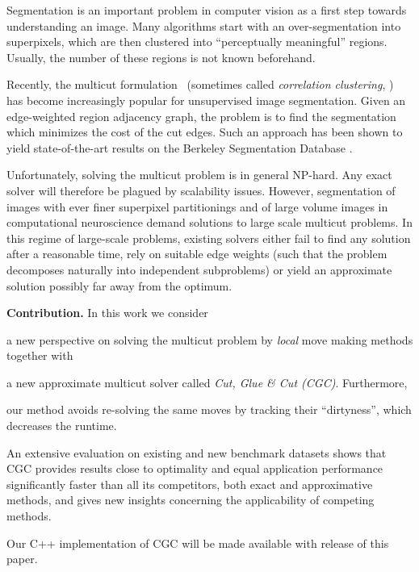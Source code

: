 Segmentation is an important problem in computer vision as a first step
towards understanding an image. Many algorithms start with an over-segmentation
into superpixels, which are then clustered into ``perceptually meaningful''
regions.
Usually, the number of these regions is not known beforehand.

Recently, the multicut formulation~\cite{chopra_1993_mp}
(sometimes called \emph{correlation clustering}, \cite{bansal_2004_ml})
has become increasingly popular for unsupervised
image segmentation.
Given an edge-weighted region adjacency graph,
the problem is to find the segmentation which
minimizes the cost of the cut edges.
Such an approach has been shown to yield
state-of-the-art results on the Berkeley Segmentation Database
\cite{andres_2011_iccv,yarkony_2012_eccv,alush_2013_simbad}.

Unfortunately, solving the multicut problem is in general NP-hard.
Any exact solver will therefore be plagued by scalability issues.
However, segmentation of images with ever finer superpixel
partitionings and of large volume images in computational neuroscience 
\cite{kroeger_2012_eccv}
demand solutions to large scale multicut problems.
%
In this regime of large-scale problems, existing solvers either
fail to find any solution after a reasonable time,
rely on suitable edge weights (such that the problem decomposes naturally
into independent subproblems) 
or yield an approximate solution possibly far away from the optimum.

\vspace{0.1cm}
\noindent
\textbf{Contribution.}
In this work we consider 
\begin{inparaenum}[(i)]
\item
a new perspective on solving the multicut problem by
\emph{local} move making methods together with
%
\item
a new approximate multicut solver called
\emph{Cut, Glue \& Cut (CGC)}. Furthermore,
%
\item our method avoids re-solving the same moves
by tracking their ``dirtyness'', which decreases the runtime. 
%
\item
An extensive evaluation on existing and new benchmark datasets shows
that CGC provides results close to optimality
and equal application performance significantly faster than all its
competitors, both exact
and approximative methods, and gives new insights concerning the applicability
of competing methods.
%
\item
Our C++ implementation of CGC will be made available with release of this paper.
\end{inparaenum}

